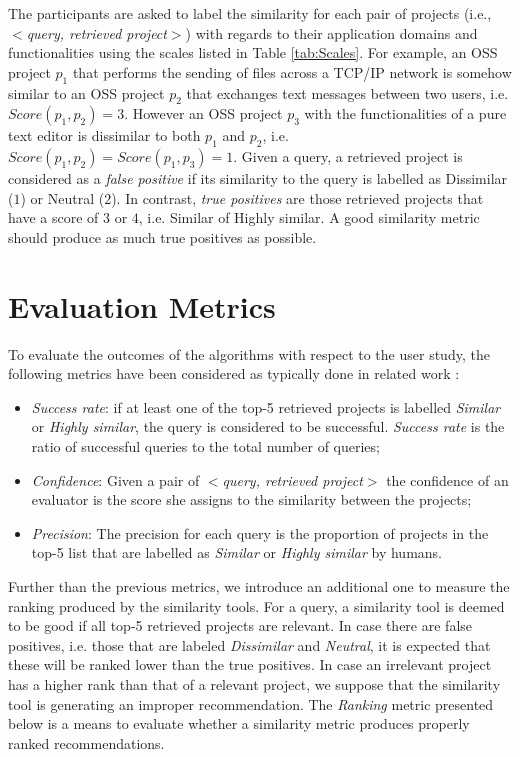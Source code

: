 The participants are asked to label the similarity for each pair of projects (i.e., $<$\textit{query, retrieved project}$>$) with regards to their application domains and functionalities using the scales listed in Table \ref{tab:Scales}. For example, an OSS project $p_{1}$ that performs the sending of files across a TCP/IP network is somehow similar to an OSS project $p_{2}$ that exchanges text messages between two users, i.e. $Score(p_{1},p_{2})=3$. However an OSS project $p_{3}$ with the functionalities of a pure text editor is dissimilar to both $p_{1}$ and $p_{2}$, i.e. $Score(p_{1},p_{2})=Score(p_{1},p_{3})=1$. Given a query, a retrieved project is considered as a \emph{false positive} if its similarity to the query is labelled as Dissimilar ($1$) or Neutral ($2$). In contrast, \emph{true positives} are those retrieved projects that have a score of $3$ or $4$, i.e. Similar of Highly similar. A good similarity metric should produce as much true positives as possible.


\section{Evaluation Metrics} \label{sec:Metrics}

To evaluate the outcomes of the algorithms with respect to the user study, the following metrics have been considered as typically done in related work \cite{Lo:2012:DSA:2473496.2473616,McMillan:2012:DSS:2337223.2337267,10.1109/SANER.2017.7884605}:

\begin{itemize}
	\item \textit{Success rate}: if at least one of the top-5 retrieved projects is labelled \emph{Similar} or \emph{Highly similar}, the query is considered to be successful. {\em Success rate} is the ratio of successful queries to the total number of queries;
	\item \textit{Confidence}: Given a pair of $<$\textit{query, retrieved project}$>$ the confidence of an evaluator is the score she assigns to the similarity between the projects;
	\item \textit{Precision}: The precision for each query is the proportion of projects in the top-5 list that are labelled as \emph{Similar} or \emph{Highly similar} by humans. 
\end{itemize}

Further than the previous metrics, we introduce an additional one to measure the ranking produced by the similarity tools. For a query, a similarity tool is deemed to be good if all top-5 retrieved projects are relevant. In case there are false positives, i.e. those that are labeled \emph{Dissimilar} and \emph{Neutral}, it is expected that these will be ranked lower than the true positives. In case an irrelevant project has a higher rank than that of a relevant project, we suppose that the similarity tool is generating an improper recommendation. The \emph{Ranking} metric presented below is a means to evaluate whether a similarity metric produces properly ranked recommendations. 





